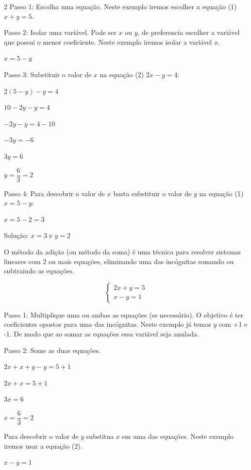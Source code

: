 \documentclass[12pt]{article}
\begin{document}
\begin{multicols}{2}
Passo 1: Escolha uma equação. Neste exemplo iremos escolher a equação (1) $x + y = 5$.

Passo 2: Isolar uma variável. Pode ser $x$ ou $y$, de preferencia escolher a variável que possui o menor coeficiente. Neste exemplo iremos isolar a variável $x$.

$x = 5 - y$

Passo 3: Substituir o valor de $x$ na equação (2) $2x - y = 4$:

$2(5 - y) - y = 4 $

$10 -2y -y = 4 $

$ -2y -y = 4 -10 $

$ -3y = -6 $

$ 3y = 6 $
\vspace{10px}

$y = \dfrac{6}{3}=2$
\vspace{10px}

Passo 4: Para descobrir o valor de $x$ basta substituir o valor de $y$ na equação (1) $x = 5 - y$:

$x = 5 - 2 = 3$

Solução: $x = 3$ e $y = 2$


O método da adição (ou método da soma) é uma técnica para resolver sistemas lineares com 2 ou mais equações, eliminando uma das incógnitas somando ou subtraindo as equações.


$$
\begin{cases}
2x + y = 5 \\
x - y = 1
\end{cases}
$$


Passo 1: Multiplique uma ou ambas as equações (se necessário). O objetivo é ter coeficientes opostos para uma das incógnitas. Neste exemplo já temos $y$ com +1 e -1. De modo que ao somar as equações essa variável seja anulada.

Passo 2: Some as duas equações.

$2x + x +y -y = 5 + 1 $

$2x + x = 5 + 1 $

$ 3x = 6 $
\vspace{10px}

$x=\dfrac{6}{3}=2$
\vspace{10px}

Para descobrir o valor de $y$ substitua $x$ em uma das equações. Neste exemplo iremos usar a equação (2).

$x - y = 1$ 


\end{multicols}
\end{document}
